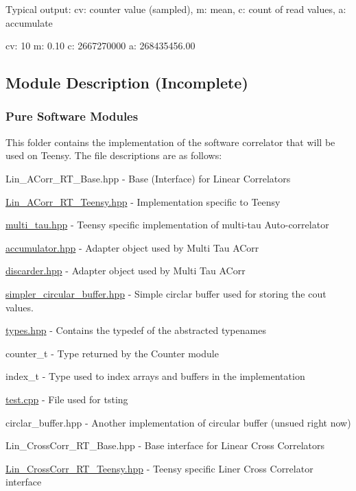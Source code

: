 Typical output\+: cv\+: counter value (sampled), m\+: mean, c\+: count of read values, a\+: accumulate


\begin{DoxyCode}
cv: 10  m: 0.10  c: 2667270000  a: 268435456.00
\end{DoxyCode}


\subsection*{Module Description ({\ttfamily Incomplete})}

\subsubsection*{Pure Software Modules}

This folder contains the implementation of the software correlator that will be used on Teensy. The file descriptions are as follows\+:


\begin{DoxyItemize}
\item {\ttfamily Lin\+\_\+\+A\+Corr\+\_\+\+R\+T\+\_\+\+Base.\+hpp} -\/ Base (Interface) for Linear Correlators
\item {\ttfamily \hyperlink{Lin__ACorr__RT__Teensy_8hpp}{Lin\+\_\+\+A\+Corr\+\_\+\+R\+T\+\_\+\+Teensy.\+hpp}} -\/ Implementation specific to Teensy
\item {\ttfamily \hyperlink{multi__tau_8hpp}{multi\+\_\+tau.\+hpp}} -\/ Teensy specific implementation of multi-\/tau Auto-\/correlator
\item {\ttfamily \hyperlink{accumulator_8hpp}{accumulator.\+hpp}} -\/ Adapter object used by Multi Tau A\+Corr
\item {\ttfamily \hyperlink{discarder_8hpp}{discarder.\+hpp}} -\/ Adapter object used by Multi Tau A\+Corr
\item {\ttfamily \hyperlink{simpler__circular__buffer_8hpp}{simpler\+\_\+circular\+\_\+buffer.\+hpp}} -\/ Simple circlar buffer used for storing the cout values.
\item {\ttfamily \hyperlink{types_8hpp}{types.\+hpp}} -\/ Contains the {\ttfamily typedef} of the abstracted typenames
\begin{DoxyItemize}
\item {\ttfamily counter\+\_\+t} -\/ Type returned by the Counter module
\item {\ttfamily index\+\_\+t} -\/ Type used to index arrays and buffers in the implementation
\end{DoxyItemize}
\item {\ttfamily \hyperlink{test_8cpp}{test.\+cpp}} -\/ File used for tsting
\item {\ttfamily circlar\+\_\+buffer.\+hpp} -\/ Another implementation of circular buffer (unsued right now)
\item {\ttfamily Lin\+\_\+\+Cross\+Corr\+\_\+\+R\+T\+\_\+\+Base.\+hpp} -\/ Base interface for Linear Cross Correlators
\item {\ttfamily \hyperlink{Lin__CrossCorr__RT__Teensy_8hpp}{Lin\+\_\+\+Cross\+Corr\+\_\+\+R\+T\+\_\+\+Teensy.\+hpp}} -\/ Teensy specific Liner Cross Correlator interface
\end{DoxyItemize}

